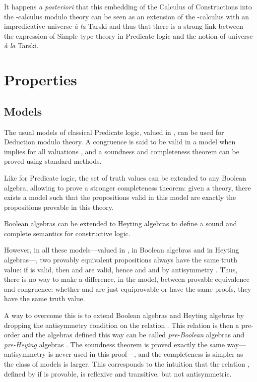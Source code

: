 \documentclass{llncs}
\begin{document}
It happens {\em a posteriori} that this embedding of the 
Calculus of Constructions into the -calculus modulo theory 
can be seen as an extension of the -calculus with an 
impredicative universe {\em \`a la} Tarski \cite{Assaf} 
and thus that there is a strong 
link between the expression of Simple type theory in Predicate logic and 
the notion of universe {\em \`a la} Tarski.

\section{Properties}

\subsection{Models}

The usual models of classical Predicate logic, valued in , 
can be used for Deduction modulo theory. A congruence  is said 
to be valid in a model when  implies 
 for all valuations , and a
soundness and completeness theorem can be proved using standard 
methods.

Like for Predicate logic, the set of truth values  can be
extended to any Boolean algebra, allowing to prove a stronger
completeness theorem: given a theory, 
there exists a model such that the propositions
valid in this model are exactly the propositions provable in this
theory.

Boolean algebras can be extended to Heyting algebras to define 
a sound and complete semantics for constructive logic.

However, in all these models---valued in , in Boolean algebras and 
in Heyting algebras---, two provably equivalent propositions always have the
same truth value: if  is valid, then  and  are valid, hence  and  and by
antisymmetry .  Thus, there is no way to make a difference, in the
model, between provable equivalence and congruence: whether  and 
are just equiprovable or have the same proofs, they have the same
truth value.

A way to overcome this is to extend Boolean algebras and Heyting
algebras by dropping the antisymmetry condition on the relation
. This relation is then a pre-order and the algebras defined
this way can be called {\em pre-Boolean} algebras \cite{BHH} and {\em
  pre-Heying} algebras \cite{TVA}. The soundness theorem is
proved exactly the same way---antisymmetry is never used in this
proof---, and the completeness is simpler as the class of models is
larger. This corresponds to the intuition that the relation
, defined by  if  is provable,
is reflexive and transitive, but not antisymmetric.
\end{document}
